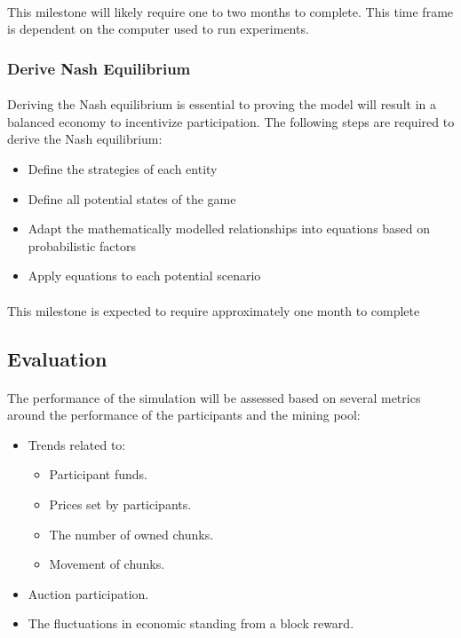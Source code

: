 \paragraph{} This milestone will likely require one to two months to complete. This time frame is dependent on the computer used to run experiments.

\subsubsection{Derive Nash Equilibrium}

\paragraph{} Deriving the Nash equilibrium is essential to proving the model will result in a balanced economy to incentivize participation. The following steps are required to derive the Nash equilibrium:

\begin{itemize}
  \item Define the strategies of each entity
  \item Define all potential states of the game
  \item Adapt the mathematically modelled relationships into equations based on probabilistic factors
  \item Apply equations to each potential scenario
\end{itemize}

\paragraph{} This milestone is expected to require approximately one month to complete

\subsection{Evaluation}

\paragraph{} The performance of the simulation will be assessed based on several metrics around the performance of the participants and the mining pool:

\begin{itemize}
  \item Trends related to:
    \begin{itemize}
      \item Participant funds.
      \item Prices set by participants.
      \item The number of owned chunks.
      \item Movement of chunks.
    \end{itemize}
  \item Auction participation.
  \item The fluctuations in economic standing from a block reward.
\end{itemize}

